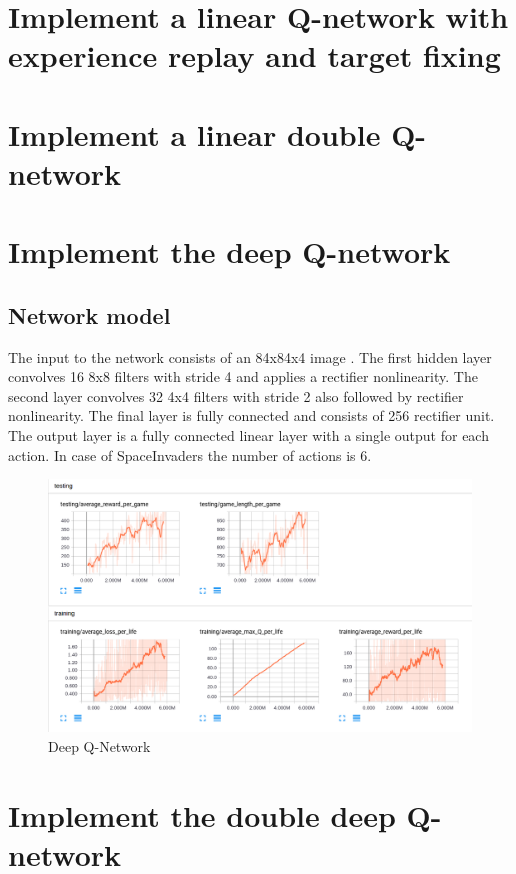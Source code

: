\documentclass{article}
\begin{document}
\section*{Implement a linear Q-network with experience replay and target fixing}

\section*{Implement a linear double Q-network}

\section*{Implement the deep Q-network}
\subsection*{Network model}
The input to the network consists of an 84x84x4 image . The first hidden layer convolves 16 8x8 filters with stride 4 and applies a rectifier nonlinearity. The second layer convolves 32 4x4 filters with stride 2 also followed by rectifier nonlinearity. The final layer is fully connected and consists of 256 rectifier unit. The output layer is a fully connected linear layer with a single output for each action. In case of SpaceInvaders the number of actions is 6.

\begin{figure}[h]
\centering
\includegraphics[scale=0.3]{dqn.png}
\caption{Deep Q-Network}
\end{figure}

\section*{Implement the double deep Q-network}
\end{document}
